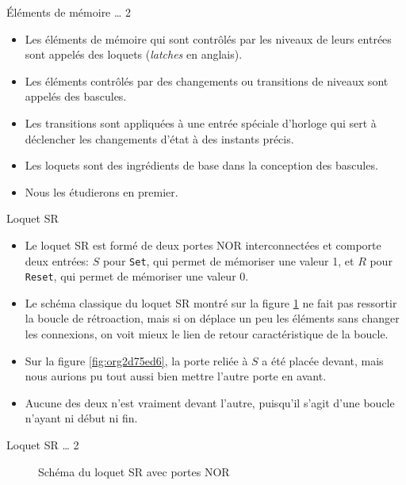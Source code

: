 \documentclass[presentation]{beamer}
\begin{document}
\begin{frame}[label={sec:orga0bf946}]{Éléments de mémoire \ldots{} 2}
\begin{itemize}
\item Les éléments de mémoire qui sont contrôlés par les niveaux de leurs entrées sont appelés des \alert{loquets} (\emph{latches} en anglais).

\item Les éléments contrôlés par des changements ou \alert{transitions} de niveaux sont appelés des bascules.

\item Les transitions sont appliquées à une entrée spéciale d'horloge qui sert à déclencher les changements d'état à des instants précis.

\item Les loquets sont des ingrédients de base dans la conception des bascules.

\item Nous les étudierons en premier.
\end{itemize}
\end{frame}


\begin{frame}[label={sec:orgcc2f470},fragile]{Loquet SR}
 \begin{itemize}
\item Le loquet SR est formé de deux portes NOR interconnectées et comporte deux entrées: \(S\) pour \texttt{Set}, qui permet de mémoriser une valeur 1, et \(R\) pour \texttt{Reset}, qui permet de mémoriser une valeur 0.

\item Le schéma classique du loquet SR montré sur la figure \ref{fig:org45831ec} ne fait pas ressortir la boucle de rétroaction, mais si on déplace un peu les éléments sans changer les connexions, on voit mieux le lien de retour caractéristique de la boucle.

\item Sur la figure \ref{fig:org2d75ed6}, la porte reliée à \(S\) a été placée devant, mais nous aurions pu tout aussi bien mettre l'autre porte en avant.

\item Aucune des deux n'est vraiment devant l'autre, puisqu'il s'agit d'une boucle n'ayant ni début ni fin.
\end{itemize}
\end{frame}

\begin{frame}[label={sec:org46b76e9}]{Loquet SR \ldots{} 2}
\begin{figure}[htbp]
\centering

\caption{\label{fig:org45831ec}Schéma du loquet SR avec portes NOR}
\end{figure}
\end{frame}
\end{document}
